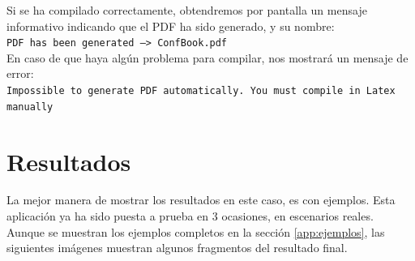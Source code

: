 \documentclass[a4paper, 12pt]{book}
\begin{document}
Si se ha compilado correctamente, obtendremos por pantalla un mensaje informativo indicando que el PDF ha sido generado, y su nombre:\\
\texttt{PDF has been generated --> ConfBook.pdf}\\

En caso de que haya algún problema para compilar, nos mostrará un mensaje de error:\\
\texttt{Impossible to generate PDF automatically. You must compile in Latex manually}



\cleardoublepage
\chapter{Resultados}
\label{chap:resultados}
La mejor manera de mostrar los resultados en este caso, es con ejemplos. Esta aplicación ya ha sido puesta a prueba en 3 ocasiones, en escenarios reales.\\

Aunque se muestran los ejemplos completos en la sección \ref{app:ejemplos}, las siguientes imágenes muestran algunos fragmentos del resultado final.\\
\end{document}
